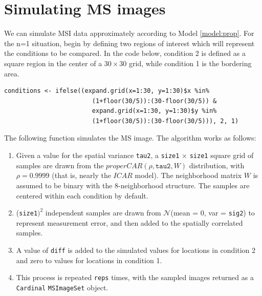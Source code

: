 \documentclass[a4paper]{article}\usepackage[]{graphicx}\usepackage[]{color}
\makeatletter
\newenvironment{kframe}{%
 \def\at@end@of@kframe{}%
 \ifinner\ifhmode%
  \def\at@end@of@kframe{\end{minipage}}%
  \begin{minipage}{\columnwidth}%
 \fi\fi%
 \def\FrameCommand##1{\hskip\@totalleftmargin \hskip-\fboxsep
 \colorbox{shadecolor}{##1}\hskip-\fboxsep
     \hskip-\linewidth \hskip-\@totalleftmargin \hskip\columnwidth}%
 \MakeFramed {\advance\hsize-\width
   \@totalleftmargin\z@ \linewidth\hsize
   \@setminipage}}%
 {\par\unskip\endMakeFramed%
 \at@end@of@kframe}
\newenvironment{knitrout}{}{} %
\makeatother
\begin{document}
\section{Simulating MS images}
We can simulate MSI data approximately according to Model \ref{model:prop}. For the n=1 situation, begin by defining two regions of interest which will represent the conditions to be compared. In the code below, condition 2 is defined as a square region in the center of a $30\times 30$ grid, while condition 1 is the bordering area.
\begin{knitrout}
\color{fgcolor}\begin{kframe}
\begin{verbatim}
conditions <- ifelse((expand.grid(x=1:30, y=1:30)$x %in% 
                        (1+floor(30/5)):(30-floor(30/5)) & 
                        expand.grid(x=1:30, y=1:30)$y %in% 
                        (1+floor(30/5)):(30-floor(30/5))), 2, 1)
\end{verbatim}
\end{kframe}
\end{knitrout}

The following function simulates the MS image. The algorithm works as follows:

\begin{enumerate}
\item Given a value for the spatial variance \texttt{tau2}, a \texttt{size1} $\times$ \texttt{size1} square grid of samples are drawn from the $properCAR(\rho, \texttt{tau2}, W)$ distribution, with $\rho = 0.9999$ (that is, nearly the $ICAR$ model). The neighborhood matrix $W$ is assumed to be binary with the 8-neighborhood structure. The samples are centered within each condition by default.
\item (\texttt{size1}$)^2$ independent samples are drawn from $\mathcal{N}$(mean = 0, var = \texttt{sig2}) to represent measurement error, and then added to the spatially correlated samples.
\item A value of \texttt{diff} is added to the simulated values for locations in condition 2 and zero to values for locations in condition 1.
\item This process is repeated \texttt{reps} times, with the sampled images returned as a \texttt{Cardinal} \texttt{MSImageSet} object.
\end{enumerate}
\end{document}
